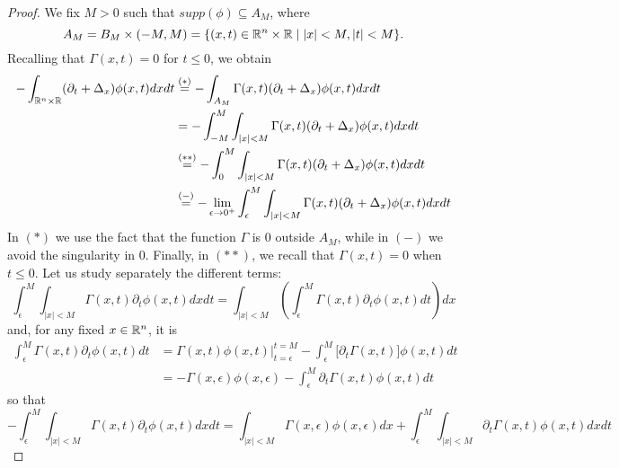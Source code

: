 \begin{ProofBox}
    \begin{proof}
        We fix $M > 0$ such that $supp(\phi) \subseteq A_M$, where 
        \begin{equation*}
            A_M = B_M \times (-M,M) = \{(x,t) \in \mathbb{R}^n \times \mathbb{R} \mid |x|< M, |t| < M \}.
        \end{equation*}
        Recalling that $\Gamma(x,t) = 0$ for $t \leq 0$, we obtain 
        \begin{align*}
            - \int_{\mathbb{R}^n \times \mathbb{R}} (\partial_t + \Delta_x) \phi(x,t) dx dt & \stackrel{(*)}= -\int_{A_M} \Gamma(x,t) (\partial_t + \Delta_x) \phi(x,t) dx dt \\
            &= - \int_{-M}^M \int_{|x| < M} \Gamma(x,t) (\partial_t + \Delta_x) \phi(x,t) dx dt \\
            &\stackrel{(**)}= - \int_0^M \int_{|x|< M} \Gamma(x,t) (\partial_t + \Delta_x) \phi(x,t) dxdt \\
            &\stackrel{(-)}= -\lim_{\epsilon \rightarrow 0^+} \int_\epsilon^M \int_{|x| < M} \Gamma(x,t) (\partial_t + \Delta_x) \phi(x,t) dxdt 
        \end{align*}
        In $(*)$ we use the fact that the function $\Gamma$ is $0$ outside $A_M$, while in $(-)$ we avoid the singularity in $0$. Finally, in $(**)$, we recall that $\Gamma(x,t) = 0$ when $t \leq 0$. 
        Let us study separately the different terms:
        \begin{equation*}
            \int_\epsilon^M \int_{|x|<M} \Gamma (x,t) \partial_t\phi(x,t) dx dt = \int_{|x| < M} (\int_\epsilon^M \Gamma(x,t) \partial_t \phi(x,t) dt) dx 
        \end{equation*}
        and, for any fixed $x \in \mathbb{R}^n$, it is 
        \begin{align*}
            \int_\epsilon^M \Gamma(x,t) \partial_t \phi(x,t) dt &= \Gamma(x,t) \phi(x,t) |_{t=\epsilon}^{t = M} -\int_\epsilon^M \Bigg[\partial_t \Gamma(x,t)\Bigg] \phi(x,t) dt \\
            &= - \Gamma(x,\epsilon) \phi(x,\epsilon) - \int_\epsilon^M \partial_t \Gamma(x,t) \phi(x,t) dt 
        \end{align*}
        so that 
        \begin{equation*}
            - \int_\epsilon^M \int_{|x|<M} \Gamma (x,t) \partial_t\phi(x,t) dx dt = \int_{|x| < M} \Gamma(x,\epsilon) \phi(x,\epsilon) dx + \int_\epsilon^M \int_{|x| < M} \partial_t \Gamma(x,t) \phi(x,t) dx dt 
        \end{equation*}

\end{proof}
\end{ProofBox}
